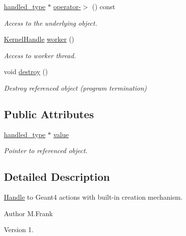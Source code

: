 \begin{DoxyCompactItemize}
\hyperlink{class_d_d4hep_1_1_simulation_1_1_kernel_handle_ab3846addea4978dab36bdb0cfb53dc34}{handled\+\_\+type} $\ast$ \hyperlink{class_d_d4hep_1_1_simulation_1_1_kernel_handle_a8d1f7c22169c2cfd0148827213a9071d}{operator-\/$>$} () const
\begin{DoxyCompactList}\small\item\em Access to the underlying object. \end{DoxyCompactList}\item 
\hyperlink{class_d_d4hep_1_1_simulation_1_1_kernel_handle}{Kernel\+Handle} \hyperlink{class_d_d4hep_1_1_simulation_1_1_kernel_handle_a456dfc14c139dfc0e7dc06e0d891fd15}{worker} ()
\begin{DoxyCompactList}\small\item\em Access to worker thread. \end{DoxyCompactList}\item 
void \hyperlink{class_d_d4hep_1_1_simulation_1_1_kernel_handle_a955f15990b4af24d3e862c45b99e041f}{destroy} ()
\begin{DoxyCompactList}\small\item\em Destroy referenced object (program termination) \end{DoxyCompactList}\end{DoxyCompactItemize}
\subsection*{Public Attributes}
\begin{DoxyCompactItemize}
\item 
\hyperlink{class_d_d4hep_1_1_simulation_1_1_kernel_handle_ab3846addea4978dab36bdb0cfb53dc34}{handled\+\_\+type} $\ast$ \hyperlink{class_d_d4hep_1_1_simulation_1_1_kernel_handle_a1d57797e5b730bb29365c2cd92911582}{value}
\begin{DoxyCompactList}\small\item\em Pointer to referenced object. \end{DoxyCompactList}\end{DoxyCompactItemize}


\subsection{Detailed Description}
\hyperlink{class_d_d4hep_1_1_handle}{Handle} to Geant4 actions with built-\/in creation mechanism. 

\begin{DoxyAuthor}{Author}
M.\+Frank 
\end{DoxyAuthor}
\begin{DoxyVersion}{Version}
1. 
\end{DoxyVersion}


